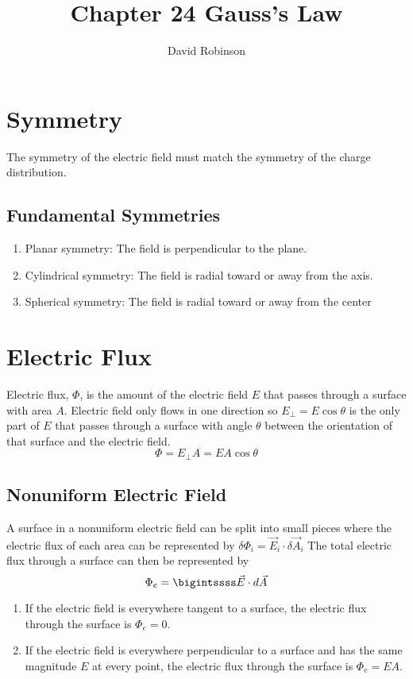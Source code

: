 \documentclass{article}
\title{Chapter 24 Gauss's Law}
\author{David Robinson}
\date{}
\begin{document}
\maketitle

\section*{Symmetry}
The symmetry of the electric field must match the symmetry of the charge distribution.

\subsection*{Fundamental Symmetries}
\begin{enumerate}
    \item Planar symmetry: The field is perpendicular to the plane.
    \item Cylindrical symmetry: The field is radial toward or away from the axis.
    \item Spherical symmetry: The field is radial toward or away from the center
\end{enumerate}

\section*{Electric Flux}
Electric flux, $\Phi$, is the amount of the electric field $E$ that passes through a surface with
area $A$.
Electric field only flows in one direction so $E_\perp=E\cos\theta$ is the only part of $E$ that
passes through a surface with angle $\theta$ between the orientation of that surface and the
electric field.
\[\Phi = E_\perp A = EA\cos\theta\]

\subsection*{Nonuniform Electric Field}
A surface in a nonuniform electric field can be split into small pieces where the electric flux of
each area can be represented by $\delta\Phi_i = \vec{E}_i\cdot\delta\vec{A}_i$
The total electric flux through a surface can then be represented by
\[\Phi_e =\bigintssss \vec{E}\cdot d\vec{A}\]

\begin{enumerate}
    \item If the electric field is everywhere tangent to a surface, the electric flux through the
    surface is $\Phi_e = 0$.
    \item If the electric field is everywhere perpendicular to a surface and has the same magnitude
    $E$ at every point, the electric flux through the surface is $\Phi_e = EA$.
\end{enumerate}
\end{document}
